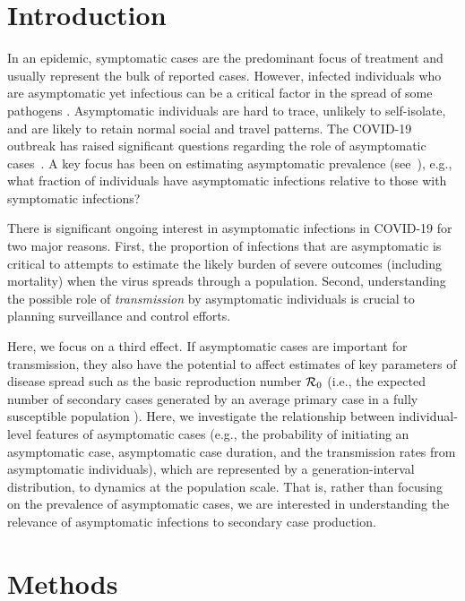 \section{Introduction}

In an epidemic, symptomatic cases are the predominant focus of treatment and usually represent the bulk of reported cases. 
However, infected individuals who are asymptomatic yet infectious can be a critical factor in the spread of some pathogens \citep{fraser2004factors}.
Asymptomatic individuals are hard to trace, unlikely to self-isolate, and are likely to retain normal social and travel patterns.
The COVID-19 outbreak has raised significant
questions regarding the role of asymptomatic cases~\citep{fauci_nejm2020}.
A key focus has been on estimating asymptomatic prevalence (see~\citep{mizumoto_2020}), e.g., what fraction of individuals have asymptomatic infections relative to those with symptomatic infections?
 
There is significant ongoing interest in asymptomatic infections in COVID-19 for two major reasons. 
First, the proportion of infections that are asymptomatic is critical to attempts to estimate the likely burden of severe outcomes (including mortality) when the virus spreads through a population.
Second, understanding the possible role of \emph{transmission} by asymptomatic individuals is crucial to planning surveillance and control efforts.

Here, we focus on a third effect. 
If asymptomatic cases are important for transmission, they also have the potential to affect estimates of key parameters of disease spread such as the basic reproduction number ${\cal{R}}_0$ (i.e., the expected number of secondary cases generated by an average primary case in a fully susceptible population \citep{anderson1992infectious}). 
Here, we investigate the relationship between individual-level features of asymptomatic cases (e.g., the probability of initiating an asymptomatic case, asymptomatic case duration, and the transmission rates from asymptomatic individuals), which are represented by a generation-interval distribution, to dynamics at the population scale.
That is, rather than focusing on the prevalence
of asymptomatic cases, we are interested in understanding the
relevance of asymptomatic infections to secondary case production.

\section{Methods}

